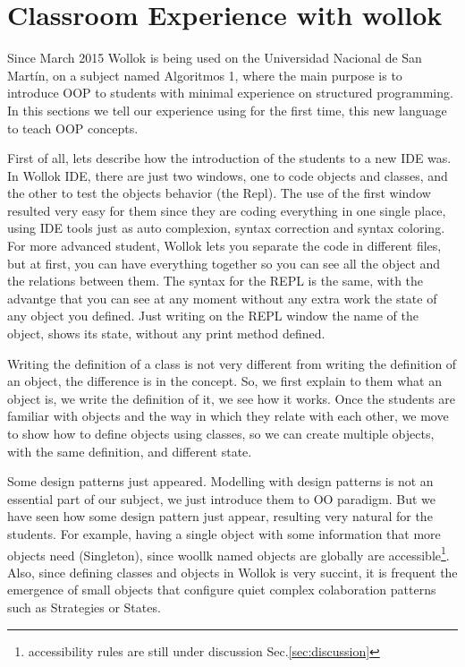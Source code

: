 \section{Classroom Experience with wollok}
\label{experience}

Since March 2015 Wollok is being used on the Universidad Nacional de San Martín, on a subject named Algoritmos 1, where the main purpose is to introduce OOP to students with minimal experience on structured programming.
In this sections we tell our experience using for the first time, this new language to teach OOP concepts.

First of all, lets describe how the introduction of the students to a new IDE was. In Wollok IDE, there are just two windows, one to code objects and classes, and the other to test the objects behavior (the Repl). The use of the first window resulted very easy for them since they are coding everything in one single place, using IDE tools just as auto complexion, syntax correction and syntax coloring. For more advanced student, Wollok lets you separate the code in different files, but at first, you can have everything together so you can see all the object and the relations between them.
The syntax for the REPL is the same, with the advantge that you can see at any moment without any extra work the state of any object you defined. Just writing on the REPL window the name of the object, shows its state, without any print method defined.

Writing the definition of a class is not very different from writing the definition of an object, the difference is in the concept. So, we first explain to them what an object is, we write the definition of it, we see how it works. Once the students are familiar with objects and the way in which they relate with each other, we move to show how to define objects using classes, so we can create multiple objects, with the same definition, and different state.

Some design patterns just appeared. Modelling with design patterns is not an essential part of our subject, we just introduce them to OO paradigm. But we have seen how some design pattern just appear, resulting very natural for the students. For example, having a single object with some information that more objects need (Singleton), since woollk named objects are globally are accessible\footnote{accessibility rules are still under discussion \cf Sec.\ref{sec:discussion}}. Also, since defining classes and objects in Wollok is very succint, it is frequent the emergence of small objects that configure quiet complex colaboration patterns such as Strategies or States\cite{Gamm93b}.


